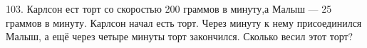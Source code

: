 103. Карлсон ест торт со скоростью 200 граммов в минуту,а Малыш --- 25 граммов в минуту. Карлсон начал есть торт. Через минуту к нему присоединился Малыш, а ещё через четыре минуты торт закончился. Сколько весил этот торт?\\
